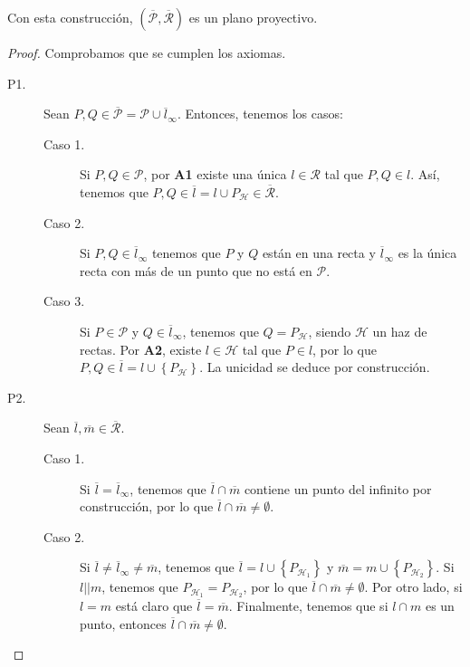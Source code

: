 \begin{theorem}
Con esta construcción, $\displaystyle \left(\overline{\mathcal{P}}, \overline{\mathcal{R}}\right) $ es un plano proyectivo.
\end{theorem}
\begin{proof}
Comprobamos que se cumplen los axiomas.
\begin{description}
\item[P1.] Sean $\displaystyle P,Q \in \overline{\mathcal{P}} = \mathcal{P} \cup \overline{l}_{\infty} $. Entonces, tenemos los casos:
	\begin{description}
	\item[Caso 1.] Si $\displaystyle P,Q \in \mathcal{P} $, por \textbf{A1} existe una única $\displaystyle l \in \mathcal{R} $ tal que $\displaystyle P,Q \in l $. Así, tenemos que $\displaystyle P,Q \in \overline{l} = l \cup P_{\mathcal{H}} \in \overline{\mathcal{R}}$. 
	\item[Caso 2.] Si $\displaystyle P,Q \in \overline{l}_{\infty}$ tenemos que $\displaystyle P $ y $\displaystyle Q $ están en una recta y $\displaystyle \overline{l}_{\infty} $ es la única recta con más de un punto que no está en $\displaystyle \mathcal{P} $. 
	\item[Caso 3.] Si $\displaystyle P \in \mathcal{P} $ y $\displaystyle Q \in \overline{l}_{\infty} $, tenemos que $\displaystyle Q = P_{\mathcal{H}} $, siendo $\displaystyle \mathcal{H}  $ un haz de rectas. Por \textbf{A2}, existe $\displaystyle l \in \mathcal{H} $ tal que $\displaystyle P \in l $, por lo que $\displaystyle P,Q \in \overline{l} = l \cup \left\{ P_{\mathcal{H}}\right\}  $. La unicidad se deduce por construcción. 
	\end{description}
\item[P2.] Sean $\displaystyle \overline{l}, \overline{m} \in \overline{\mathcal{R}} $. 
	\begin{description}
	\item[Caso 1.] Si $\displaystyle \overline{l} = \overline{l}_{\infty} $, tenemos que $\displaystyle \overline{l} \cap \overline{m} $ contiene un punto del infinito por construcción, por lo que $\displaystyle \overline{l} \cap \overline{m} \neq \emptyset $.
	\item[Caso 2.] Si $\displaystyle \overline{l} \neq \overline{l}_{\infty} \neq \overline{m} $, tenemos que $\displaystyle \overline{l} = l \cup \left\{ P_{\mathcal{H}_{1}}\right\}  $ y $\displaystyle \overline{m} = m \cup \left\{ P_{\mathcal{H}_{2}}\right\}  $. Si $\displaystyle l | | m $, tenemos que $\displaystyle P_{\mathcal{H}_{1}} = P_{\mathcal{H}_{2}} $, por lo que $\displaystyle \overline{l} \cap \overline{m} \neq \emptyset $. Por otro lado, si $\displaystyle l = m $ está claro que $\displaystyle \overline{l} = \overline{m} $. Finalmente, tenemos que si $\displaystyle l \cap m $ es un punto, entonces $\displaystyle \overline{l} \cap \overline{m} \neq \emptyset $.

\end{description}
\end{description}
\end{proof}
